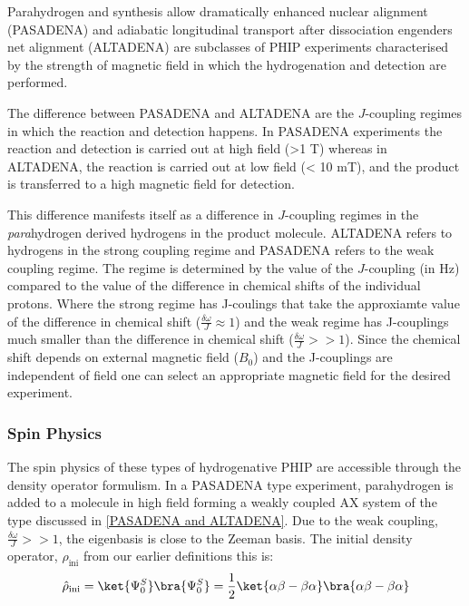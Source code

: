  Parahydrogen and synthesis allow dramatically enhanced nuclear alignment (PASADENA)\citep{RN129} and adiabatic longitudinal
 transport after dissociation engenders net alignment (ALTADENA)\citep{RN128}
 are subclasses of PHIP experiments characterised by the strength of magnetic
 field in which the hydrogenation and detection are performed.

 The difference between PASADENA and ALTADENA are the $J$-coupling regimes in which the reaction and detection happens.
 In PASADENA experiments the reaction and detection is carried out at high field (>1 T) whereas in
 ALTADENA, the reaction is carried out at low field (< 10 mT), and the product is transferred to a high magnetic field for detection\citep{RN130}.

 This difference manifests itself as a difference in $J$-coupling regimes in the \textit{para}hydrogen derived hydrogens in
 the product molecule. ALTADENA refers to hydrogens in the strong coupling regime and PASADENA refers to the weak coupling regime.
 The regime is determined by the value of the $J$-coupling (in Hz) compared to the value of the difference in chemical shifts of the individual protons.
 Where the strong regime has J-coulings that take the approxiamte value of the difference in chemical shift
 ($\frac{\delta{\omega}}{J}\approx1$) and the weak regime has J-couplings much smaller than the difference in chemical
 shift ($\frac{\delta{\omega}}{J}>>1$). Since the chemical shift depends on external magnetic field ($B_{0}$) and the
 J-couplings are independent of field one can select an appropriate magnetic field for the desired experiment.

 \subsubsection{Spin Physics}

 The spin physics of these types of hydrogenative PHIP are accessible through the density operator formulism. In a
 PASADENA type experiment, parahydrogen is added to a molecule in high field forming a weakly coupled AX
 system of the type discussed in \ref{PASADENA and ALTADENA}. Due to the weak coupling, $\frac{\delta{\omega}}{J}>>1$, the eigenbasis is close to the
 Zeeman basis. The initial density operator, $\hat{\rho}_{\text{ini}}$ from our earlier
 definitions this is:
 \begin{equation}
   \hat{\rho}_{\text{ini}} = \ket{\Psi_{0}^{S}}\bra{\Psi_{0}^{S}} = \frac{1}{2}\ket{\alpha\beta -
   \beta\alpha}\bra{\alpha\beta - \beta\alpha}
 \end{equation}

